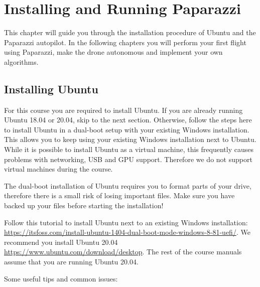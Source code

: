 \chapter{Installing and Running Paparazzi}
This chapter will guide you through the installation procedure of Ubuntu and the Paparazzi autopilot.
In the following chapters you will perform your first flight using Paparazzi, make the drone autonomous and implement your own algorithms.

\section{Installing Ubuntu}
For this course you are required to install Ubuntu.
If you are already running Ubuntu 18.04 or 20.04, skip to the next section.
Otherwise, follow the steps here to install Ubuntu in a dual-boot setup with your existing Windows installation.
This allows you to keep using your existing Windows installation next to Ubuntu.
While it is possible to install Ubuntu as a virtual machine, this frequently causes problems with networking, USB and GPU support. Therefore we do not support virtual machines during the course.

The dual-boot installation of Ubuntu requires you to format parts of your drive, therefore there is a small risk of losing important files.
Make sure you have backed up your files before starting the installation!

Follow this tutorial to install Ubuntu next to an existing Windows installation: \url{https://itsfoss.com/install-ubuntu-1404-dual-boot-mode-windows-8-81-uefi/}. We recommend you install Ubuntu 20.04 \url{https://www.ubuntu.com/download/desktop}. The rest of the course manuals assume that you are running Ubuntu 20.04.

Some useful tips and common issues:

